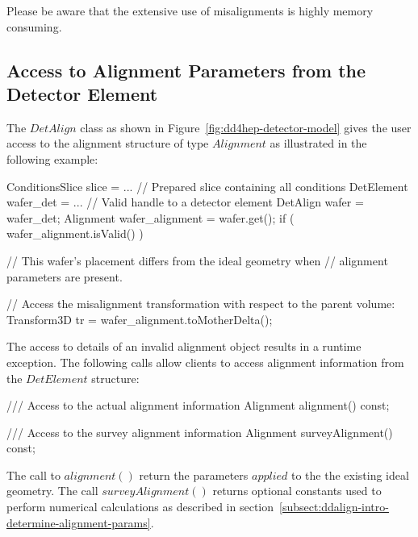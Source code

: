 \documentclass[10pt,a4paper]{article}
\begin{document}
\noindent
Please be aware that the extensive use of misalignments is highly memory
consuming.

\noindent
\subsection{Access to Alignment Parameters from the Detector Element}
\label{sec:ddalign-user-manual-misalignment-access}

\noindent
The $DetAlign$ class as shown in Figure~\ref{fig:dd4hep-detector-model}
gives the user access to the alignment structure of type $Alignment$ as 
illustrated in the following example:
\begin{code}
    ConditionsSlice slice = ...  // Prepared slice containing all conditions
    DetElement wafer_det  = ...  // Valid handle to a detector element
    DetAlign   wafer = wafer_det;
    Alignment  wafer_alignment = wafer.get();
    if ( wafer_alignment.isValid() )  {
        // This wafer's placement differs from the ideal geometry when
        // alignment parameters are present.
        
        // Access the misalignment transformation with respect to the parent volume:
        Transform3D tr = wafer_alignment.toMotherDelta();
    }
\end{code}
The access to details of an invalid alignment object results in a runtime 
exception. The following calls allow clients to access alignment information
from the $DetElement$ structure:
\begin{code}
      /// Access to the actual alignment information
      Alignment alignment() const;

      /// Access to the survey alignment information
      Alignment surveyAlignment() const;
\end{code}
The call to $alignment()$ return the parameters $applied$ to the the existing
ideal geometry. The call $surveyAlignment()$ returns optional constants used 
to perform numerical calculations as described in 
section~\ref{subsect:ddalign-intro-determine-alignment-params}.
\end{document}
